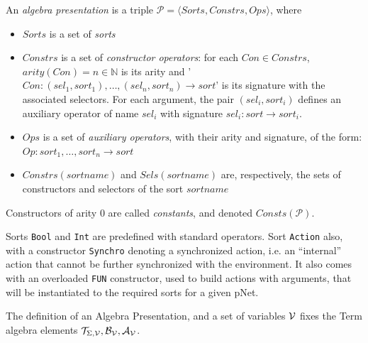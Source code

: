 \documentclass{lncs/llncs}
\newcommand{\noteSB}[2][color=green!40, size=\tiny]{\todo[#1]{{\bf
      Note: } {#2}}}
\newcommand{\cT}{\ensuremath{\mathcal{T}}}
\newcommand{\cV}{\ensuremath{\mathcal{V}}}
\newcommand{\signature}{\ensuremath{\Sigma}}
\newcommand{\variables}{\ensuremath{\cV}}
\newcommand{\Talg}{\ensuremath{\cT_{\signature,\variables}}}
\def\AlgA{\mathcal{A}}
\def\AlgB{\mathcal{B}}
\newcommand{\mdash}{---}
\begin{document}
\def\APres{\mathcal{P}}
\begin{definition}
  An \emph{algebra presentation} is a triple $\APres=\langle\mathit{Sorts},\mathit{Constrs},\mathit{Ops}\rangle$, where

  \begin{itemize}
  \item $Sorts$ is a set of \emph{sorts}
  \item $\mathit{Constrs}$ is a set of \emph{constructor operators}: for each $\mathit{Con} \in \mathit{Constrs}$, $arity(Con)=n \in \mathbb{N}$ is its arity 
    and '$Con : (\mathit{sel}_1,\mathit{sort}_1), \dots, (\mathit{sel}_n,\mathit{sort}_n) \rightarrow \mathit{sort}$' is its signature with the associated selectors.
    For each argument, the pair $(\mathit{sel}_i,\mathit{sort}_i)$ defines an auxiliary
    operator of name $\mathit{sel}_i$ with signature $\mathit{sel}_i : \mathit{sort} \rightarrow \mathit{sort}_i$.
    \item $Ops$ is a set of \emph{auxiliary operators}, with their
      arity and signature, of the form: $Op : \mathit{sort}_1, \dots,  \mathit{sort}_n \rightarrow
      \mathit{sort}$
      \item $\mathit{Constrs}(\mathit{sortname})$ and $\mathit{Sels}(\mathit{sortname})$ are, respectively, the sets of
        constructors and selectors of the sort $\mathit{sortname}$
  \end{itemize}
  Constructors of arity 0 are called \emph{constants}, and denoted $\mathit{Consts}(\APres)$.
\end{definition}


Sorts \texttt{Bool} and \texttt{Int} are predefined with standard operators.
Sort \texttt{Action} also, with a constructor \texttt{Synchro} denoting
a synchronized action, i.e. an ``internal'' action that cannot be
further synchronized with the environment. It also comes with an
overloaded \texttt{FUN} constructor, used to build actions with
arguments, that will be instantiated to the required sorts for a given
pNet.

The definition of an Algebra Presentation, and a set of variables
$\P$ fixes the Term algebra elements $\Talg, \AlgB_{\P}, \AlgA_\P$.
\end{document}
